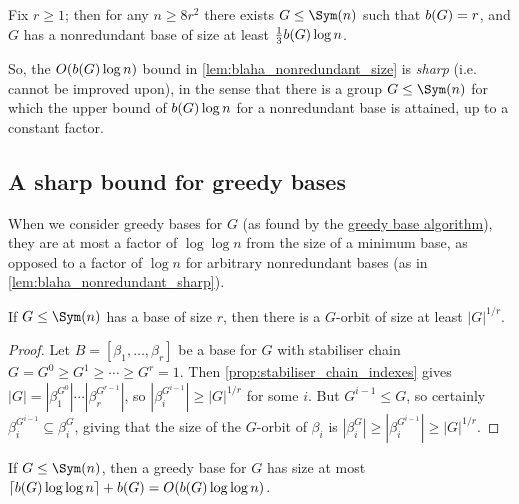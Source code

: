\begin{lemma}\label{lem:blaha_nonredundant_sharp}
    Fix $r \geq 1$; then for any $n \geq 8r^2$ there exists $G \leq \Sym(n)$ such that $\added{2}{b(G)} = r$, and $G$ has a nonredundant base of size at least $\frac{1}{3}\added{2}{b(G)}\log n$.
\end{lemma}


So, the $O(\added{2}{b(G)}\log n)$ bound in \autoref{lem:blaha_nonredundant_size} is \textit{sharp} (i.e. cannot be improved upon), in the sense that  there is a group $G \leq \Sym(n)$ for which the upper bound of $\added{2}{b(G)}\log n$ for a nonredundant base is attained, up to a constant factor.

\subsection{A sharp bound for greedy bases}

When we consider greedy bases for $G$ (as found by the \hyperref[alg:blaha_greedy_base]{greedy base algorithm}), they are at most a factor of $\log\log n$ from the size of a minimum base, as opposed to a factor of $\log n$ for arbitrary nonredundant bases (as in \autoref{lem:blaha_nonredundant_sharp}).

\begin{lemma}\label{lem:blaha_greedy_orbit}
    If $G \leq \Sym(n)$ has a base of size $r$, then there is a $G$-orbit of size at least $|G|^{1/r}$.
\end{lemma}

\begin{proof}
    Let $B = [\beta_1,\dotsc,\beta_r]$ be a base for $G$ with stabiliser chain $G = G^0 \geq G^1 \geq \dotsb \geq G^r = 1$. Then \autoref{prop:stabiliser_chain_indexes} gives $|G| = |\beta_1^{G^0}| \dotsb |\beta_r^{G^{r-1}}|$, so $|\beta_i^{G^{i-1}}| \geq |G|^{1/r}$ for some $i$. But $G^{i-1} \leq G$, so certainly $\beta_i^{G^{i-1}} \subseteq \beta_i^G$, giving that the size of the $G$-orbit of $\beta_i$ is $|\beta_i^G| \geq |\beta_i^{G^{i-1}}| \geq |G|^{1/r}$.
\end{proof}


\begin{theorem}[Blaha, 1992]\label{thm:blaha_greedy_size}
    If $G \leq \Sym(n)$, then a greedy base for $G$ has size at most $\lceil \added{2}{b(G)}\log\log n \rceil + \added{2}{b(G)} = O(\added{2}{b(G)}\log\log n)$.
\end{theorem}

